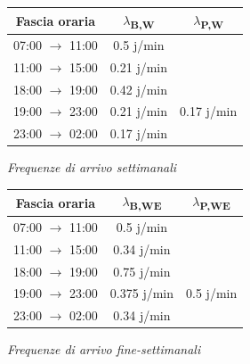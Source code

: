 \documentclass[a4paper, 12pt]{article}
\newcommand{\xmark}[0]{\ding{55}}
\begin{document}
\begin{minipage}{.5\textwidth}
\centering             
\begin{tabular}{ |c|c|c| }
	\hline
    \cellcolor{cellcolor} Fascia oraria & \cellcolor{cellcolor}$\lambda${\textsubscript{B,W}} & \cellcolor{cellcolor}$\lambda${\textsubscript{P,W}} \\
	\hline
    \hline

	07:00 $\rightarrow$ 11:00 & 0.5 j/min & \xmark \\

    \hline
    

	11:00 $\rightarrow$ 15:00 & 0.21 j/min & \xmark \\

    \hline
    

	18:00 $\rightarrow$ 19:00 & 0.42 j/min & \xmark \\

    \hline
    

	19:00 $\rightarrow$ 23:00 & 0.21 j/min & 0.17 j/min \\

    \hline
    

	23:00 $\rightarrow$ 02:00 & 0.17 j/min & \xmark \\

    \hline
\end{tabular}
\bigskip
              
\textit{Frequenze di arrivo settimanali}
\end{minipage}
%
\begin{minipage}{.5\textwidth}
\centering
\begin{tabular}{ |c|c|c| }
	\hline
    \cellcolor{cellcolor}Fascia oraria & \cellcolor{cellcolor}$\lambda${\textsubscript{B,WE}}
    &\cellcolor{cellcolor} $\lambda${\textsubscript{P,WE}} \\
    \hline
    \hline
    

	07:00 $\rightarrow$ 11:00 & 0.5 j/min & \xmark \\ 

    \hline
    

	11:00 $\rightarrow$ 15:00 & 0.34 j/min & \xmark \\

    \hline
    

	18:00 $\rightarrow$ 19:00 & 0.75 j/min & \xmark \\

    \hline
    

	19:00 $\rightarrow$ 23:00 & 0.375 j/min & 0.5 j/min \\

    \hline
    

	23:00 $\rightarrow$ 02:00 & 0.34 j/min & \xmark \\

    \hline
\end{tabular}
\bigskip
              
\textit{Frequenze di arrivo fine-settimanali} 
\end{minipage} 
\bigskip
\end{document}
